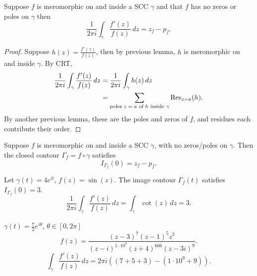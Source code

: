 \documentclass[10pt, a4paper]{article}
\begin{document}
\begin{theorem}
    Suppose $f$ is meromorphic on and inside a SCC $\gamma$ and that $f$ has no zeros or poles on $\gamma$ then
    \[
    \frac{1}{2\pi i}\int_{\gamma}\frac{f'(z)}{f(z)}\,dz = z_f - p_f.
    \]

    \begin{proof}
        Suppose $h(z) = \frac{f'(z)}{f(z)}$,
        then by previous lemma,
        $h$ is meromorphic on and inside $\gamma$.
        By CRT,
        \begin{align*}
            \frac{1}{2\pi i}\int_{\gamma}\frac{f'(z)}{f(z)}\,dz &= \frac{1}{2\pi i}\int_{\gamma}h(z)\,dz \\
            &= \sum_{\text{poles $z = a$ of $h$ inside $\gamma$}}\operatorname{Res}_{z = a}(h).
        \end{align*}
        By another previous lemma,
        these are the poles and zeros of $f$,
        and residues each contribute their order.
    \end{proof}
\end{theorem}

\begin{corollary}
    Suppose $f$ is meromorphic on and inside a SCC $\gamma$,
    with no zeros/poles on $\gamma$.
    Then the closed contour $\Gamma_f = f \circ \gamma$ satisfies
    \[
    I_{\Gamma_f}(0) = z_f - p_f.
    \]
\end{corollary}

\begin{example}
    Let $\gamma(t) = 4e ^ {it}$,
    $f(z) = \sin(z)$.
    The image contour $\Gamma_f(t)$ satisfies $I_{\Gamma_f}(0) = 3$.
    \[
    \frac{1}{2\pi i}\int_{\gamma}\frac{f'(z)}{f(z)}\,dz = \int_{\gamma}\cot(z)\,dz = 3.
    \]
\end{example}

\begin{example}
    $\gamma(t) = \frac{7}{2}e ^ {i\theta}$,
    $\theta \in [0, 2\pi]$
    \[
    f(z) = \frac{(z - 3) ^ 7(z - 1) ^ 5z ^ 3}{(z - i) ^ {1 \cdot 10 ^ 9}(z + 4) ^ {666}(z - 3i) ^ 9}.
    \]
    \[
    \int_{\gamma}\frac{f'(z)}{f(z)}\,dz = 2\pi i((7 + 5 + 3) - (1 \cdot 10 ^ 9 + 9)).
    \]
\end{example}
\end{document}
